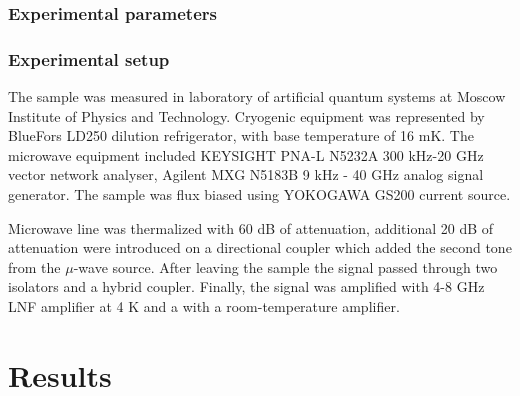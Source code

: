 \documentclass[%
 aip,
 amsmath,amssymb,
 reprint,%
]{revtex4-1}
\begin{document}
\subsubsection{Experimental parameters}
\subsubsection{Experimental setup}
The sample was measured in laboratory of artificial quantum systems at Moscow Institute of Physics and Technology. Cryogenic equipment was
represented by BlueFors LD250 dilution refrigerator, with base temperature of 16 mK. The microwave equipment included KEYSIGHT PNA-L N5232A 300 kHz-20 GHz vector network analyser, Agilent MXG N5183B 9 kHz - 40 GHz analog signal generator. The sample was 
flux biased using YOKOGAWA GS200 current source.

Microwave line was thermalized with 60 dB of attenuation, additional 20 dB of attenuation were introduced on a directional coupler which added the second tone from the $\mu$-wave source. After leaving the sample the signal passed through two isolators and a hybrid coupler. Finally, the signal was amplified with 4-8 GHz LNF amplifier at 4 K and a with a room-temperature amplifier.

\section{Results}
\end{document}
